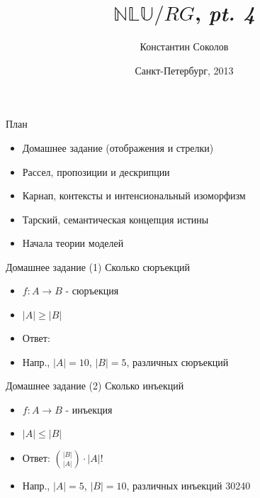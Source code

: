\documentclass{beamer}
\begin{document}
\title{\huge{$\mathbb{NLU}/RG$, \textit{pt. 4}}}
\author{Константин Соколов}
\date{Санкт-Петербург, 2013} 
\begin{frame}
    \thispagestyle{empty}
    \titlepage
\end{frame}

\begin{frame}{План}
    \setcounter{framenumber}{1}
    \begin{itemize}
        \item Домашнее задание (отображения и стрелки)
        \item Рассел, пропозиции и дескрипции
        \item Карнап, контексты и интенсиональный изоморфизм
        \item Тарский, семантическая концепция истины
        \item Начала теории моделей
    \end{itemize}
\end{frame}

\begin{frame}{Домашнее задание (1)}
Сколько сюръекций\\
  \begin{itemize}
    \item $f : A \to B$ - сюръекция
    \item $\left\vert{A}\right\vert \geq \left\vert{B}\right\vert$
    \item Ответ: 
    \item Напр., $\left\vert{A}\right\vert = 10$, $\left\vert{B}\right\vert = 5$, различных сюръекций 
  \end{itemize}  
\end{frame}

\begin{frame}{Домашнее задание (2)}
Сколько инъекций\\
  \begin{itemize}
    \item $f : A \to B$ - инъекция
    \item $\left\vert{A}\right\vert \leq \left\vert{B}\right\vert$
    \item Ответ: ${\left\vert{B}\right\vert \choose \left\vert{A}\right\vert} \cdot \left\vert{A}\right\vert!$
    \item Напр., $\left\vert{A}\right\vert = 5$, $\left\vert{B}\right\vert = 10$, различных инъекций 30240 
  \end{itemize}  
\end{frame}
\end{document}
